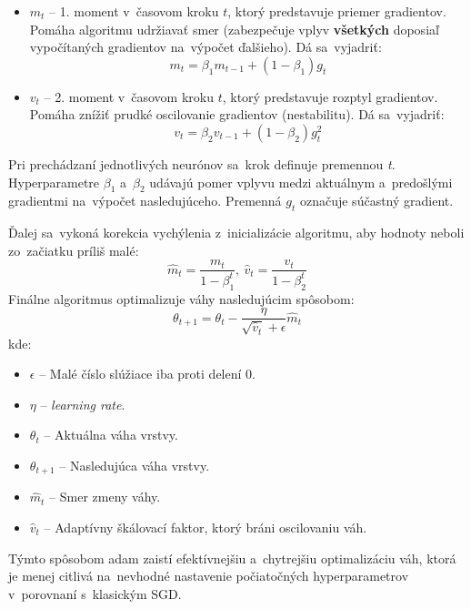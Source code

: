 \begin{itemize}
    \item $m_t$ -- 1. moment v~časovom kroku $t$, ktorý predstavuje priemer gradientov. Pomáha algoritmu udržiavať smer (zabezpečuje vplyv \textbf{všetkých} doposiaľ vypočítaných gradientov na~výpočet ďalšieho). Dá sa~vyjadriť:
        \begin{equation}
            m_t = \beta_1m_{t-1} + (1 - \beta_1)g_t
        \end{equation}
    \item $v_t$ -- 2. moment v~časovom kroku $t$, ktorý predstavuje rozptyl gradientov. Pomáha znížiť prudké oscilovanie gradientov (nestabilitu). Dá sa~vyjadriť:
        \begin{equation}
            v_t = \beta_2v_{t-1} + (1 - \beta_2)g_t^2
        \end{equation}
\end{itemize}
Pri prechádzaní jednotlivých neurónov sa~krok definuje premennou \textit{t}. Hyperparametre $\beta_1$ a~$\beta_2$ udávajú pomer vplyvu medzi aktuálnym a~predošlými gradientmi na~výpočet nasledujúceho. Premenná $g_t$ označuje súčastný gradient. 

Ďalej sa~vykoná korekcia vychýlenia z~inicializácie algoritmu, aby hodnoty neboli zo~začiatku príliš malé:
\begin{equation}
    \hat{m}_t = \frac{m_t}{1-\beta^t_1},~ \hat{v}_t = \frac{v_t}{1 - \beta^t_2}
\end{equation}
Finálne algoritmus optimalizuje váhy nasledujúcim spôsobom:
\begin{equation}
    \theta_{t+1} = \theta_t - \frac{\eta}{\sqrt{\hat{v}_t}+\epsilon} \hat{m}_t
\end{equation}
kde:
\begin{itemize}
    \item $\epsilon$ -- Malé číslo slúžiace iba proti delení 0.
    \item $\eta$ -- \textit{learning rate}.
    \item $\theta_t$ -- Aktuálna váha vrstvy.
    \item $\theta_{t+1}$ -- Nasledujúca váha vrstvy.
    \item $\hat{m}_t$ -- Smer zmeny váhy.
    \item $\hat{v}_t$ -- Adaptívny škálovací faktor, ktorý bráni oscilovaniu váh.
\end{itemize}
Týmto spôsobom adam zaistí efektívnejšiu a~chytrejšiu optimalizáciu váh, ktorá je menej citlivá na~nevhodné nastavenie počiatočných hyperparametrov v~porovnaní s~klasickým SGD.

